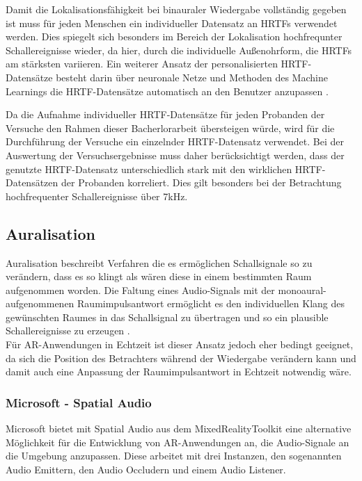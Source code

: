  Damit die Lokalisationsfähigkeit bei binauraler Wiedergabe vollständig gegeben ist muss für jeden Menschen ein individueller Datensatz an HRTFs verwendet werden. Dies spiegelt sich besonders im Bereich der Lokalisation hochfrequnter Schallereignisse wieder, da hier, durch die individuelle Außenohrform, die HRTFs am stärksten variieren.
 Ein weiterer Ansatz der personalisierten HRTF-Datensätze besteht darin über neuronale Netze und Methoden des Machine Learnings die HRTF-Datensätze automatisch an den Benutzer anzupassen \cite{MSHRTF}. 
 
 Da die Aufnahme individueller HRTF-Datensätze für jeden Probanden der Versuche den Rahmen dieser Bacherlorarbeit übersteigen würde, wird für die Durchführung der Versuche ein einzelnder HRTF-Datensatz verwendet. Bei der Auswertung der Versuchsergebnisse muss daher berücksichtigt werden, dass der genutzte HRTF-Datensatz unterschiedlich stark mit den wirklichen HRTF-Datensätzen der Probanden korreliert. Dies gilt besonders bei der Betrachtung hochfrequenter Schallereignisse über 7kHz. 
 
 \subsection{Auralisation} 

Auralisation beschreibt Verfahren die es ermöglichen Schallsignale so zu verändern, dass es so klingt als wären diese in einem bestimmten Raum aufgenommen worden. Die Faltung eines Audio-Signals mit der monoaural-aufgenommenen Raumimpulsantwort ermöglicht es den individuellen Klang des gewünschten Raumes  in das  Schallsignal zu übertragen und so ein plausible Schallereignisse zu erzeugen  \cite[S.521]{HdA08}. \\

Für AR-Anwendungen in Echtzeit ist dieser Ansatz jedoch eher bedingt geeignet, da sich die Position des Betrachters während der Wiedergabe verändern kann und damit auch eine Anpassung der Raumimpulsantwort in Echtzeit notwendig wäre. \\


\subsubsection{Microsoft - Spatial Audio}
Microsoft bietet mit Spatial Audio aus dem MixedRealityToolkit eine alternative Möglichkeit für die Entwicklung von AR-Anwendungen an, die Audio-Signale  an die Umgebung anzupassen. Diese arbeitet mit drei Instanzen, den sogenannten Audio Emittern, den  Audio Occludern und einem Audio Listener.\\


